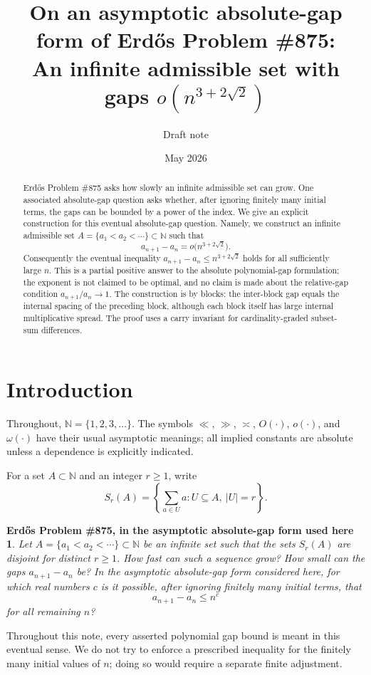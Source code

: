 \documentclass[11pt]{article}
\title{On an asymptotic absolute-gap form of Erd\H{o}s Problem \#875:\\
An infinite admissible set with gaps $o(n^{3+2\sqrt2})$}
\author{Draft note}
\date{May 2026}
\newtheorem*{problem875}{Erd\H{o}s Problem \#875, in the asymptotic absolute-gap form used here}
\newcommand{\N}{\mathbb{N}}
\begin{document}
\maketitle

\begin{abstract}
Erd\H{o}s Problem \#875 asks how slowly an infinite admissible set can grow.  One associated absolute-gap question asks whether, after ignoring finitely many initial terms, the gaps can be bounded by a power of the index.  We give an explicit construction for this eventual absolute-gap question.  Namely, we construct an infinite admissible set $A=\{a_1<a_2<\cdots\}\subset\N$ such that
\[
        a_{n+1}-a_n=o\bigl(n^{3+2\sqrt2}\bigr).
\]
Consequently the eventual inequality $a_{n+1}-a_n\le n^{3+2\sqrt2}$ holds for all sufficiently large $n$.  This is a partial positive answer to the absolute polynomial-gap formulation; the exponent is not claimed to be optimal, and no claim is made about the relative-gap condition $a_{n+1}/a_n\to1$.  The construction is by blocks: the inter-block gap equals the internal spacing of the preceding block, although each block itself has large internal multiplicative spread.  The proof uses a carry invariant for cardinality-graded subset-sum differences.
\end{abstract}

\section{Introduction}

Throughout, $\N=\{1,2,3,\ldots\}$.  The symbols $\ll$, $\gg$, $\asymp$, $O(\cdot)$, $o(\cdot)$, and $\omega(\cdot)$ have their usual asymptotic meanings; all implied constants are absolute unless a dependence is explicitly indicated.

For a set $A\subset\N$ and an integer $r\ge1$, write
\[
        S_r(A)=\left\{\sum_{a\in U}a: U\subseteq A,\ |U|=r\right\}.
\]

\begin{problem875}
Let $A=\{a_1<a_2<\cdots\}\subset\N$ be an infinite set such that the sets $S_r(A)$ are disjoint for distinct $r\ge1$.  How fast can such a sequence grow?  How small can the gaps $a_{n+1}-a_n$ be?  In the asymptotic absolute-gap form considered here, for which real numbers $c$ is it possible, after ignoring finitely many initial terms, that
\[
        a_{n+1}-a_n\le n^c
\]
for all remaining $n$?
\end{problem875}

Throughout this note, every asserted polynomial gap bound is meant in this eventual sense.  We do not try to enforce a prescribed inequality for the finitely many initial values of $n$; doing so would require a separate finite adjustment.
\end{document}

